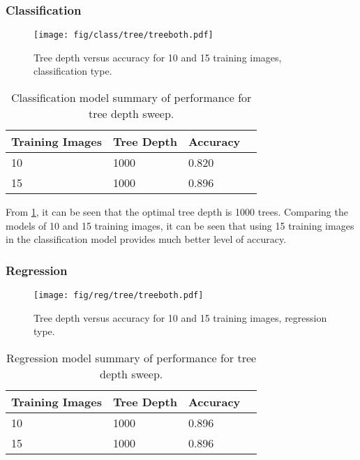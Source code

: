 \subsubsection{Classification}
\begin{figure}[H]
\centering
\texttt{[image: fig/class/tree/treeboth.pdf]}
\caption{Tree depth versus accuracy for 10 and 15 training images, classification type.}
\label{class:tree}
\end{figure}

\begin{table}[H]
\centering
\caption{Classification model summary of performance for tree depth sweep.}

\begin{tabular}{|l|l|l|l|}
\hline
 \textbf{Training Images} &	\textbf{Tree Depth} & \textbf{Accuracy}\\
\hline
10 & 1000 & 0.820\\
\hline				    	 			
15 & 1000 & 0.896 \\	
\hline		    	 
\end{tabular}
\label{table:classtree}
\end{table}

From \ref{table:classtree}, it can be seen that the optimal tree depth is 1000 trees. Comparing the models of 10 and 15 training images, it can be seen that using 15 training images in the classification model provides much better level of accuracy.

\subsubsection{Regression}

\begin{figure}[H]
\centering
\texttt{[image: fig/reg/tree/treeboth.pdf]}
\caption{Tree depth versus accuracy for 10 and 15 training images, regression type.}
\label{reg:tree}
\end{figure}

\begin{table}[H]
\centering
\caption{Regression model summary of performance for tree depth sweep.}

\begin{tabular}{|l|l|l|l|}
\hline
 \textbf{Training Images} &	\textbf{Tree Depth} & \textbf{Accuracy}\\
\hline
10 & 1000 & 0.896\\
\hline				    	 			
15 & 1000 & 0.896 \\	
\hline		    	 
\end{tabular}
\label{table:regtree}
\end{table}

